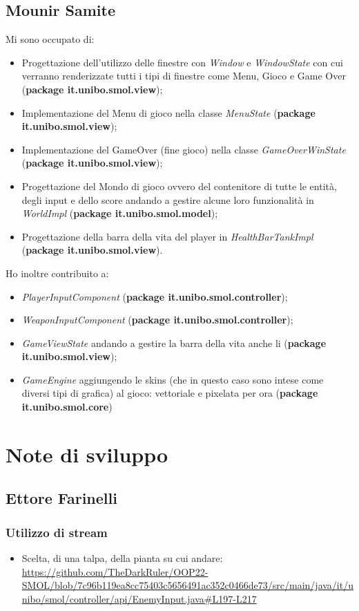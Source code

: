 \documentclass[a4paper,12pt]{report}
\begin{document}
\subsection*{Mounir Samite}
Mi sono occupato di:
\begin{itemize}
    \item Progettazione dell'utilizzo delle finestre con \emph{Window} e \emph{WindowState} con cui verranno renderizzate tutti i tipi di finestre come Menu, Gioco e Game Over (\textbf{package it.unibo.smol.view});
    \item Implementazione del Menu di gioco nella classe \emph{MenuState} (\textbf{package it.unibo.smol.view});
    \item Implementazione del GameOver (fine gioco) nella classe \emph{GameOverWinState} (\textbf{package it.unibo.smol.view});
    \item Progettazione del Mondo di gioco ovvero del contenitore di tutte le entità, degli input e dello score andando a gestire alcune loro funzionalità in \emph{WorldImpl} (\textbf{package it.unibo.smol.model});
    \item Progettazione della barra della vita del player in \emph{HealthBarTankImpl} (\textbf{package it.unibo.smol.view}).
\end{itemize}
Ho inoltre contribuito a:
\begin{itemize}
    \item \emph{PlayerInputComponent} (\textbf{package it.unibo.smol.controller});
    \item \emph{WeaponInputComponent} (\textbf{package it.unibo.smol.controller});
    \item \emph{GameViewState} andando a gestire la barra della vita anche li (\textbf{package it.unibo.smol.view});
    \item \emph{GameEngine} aggiungendo le skins (che in questo caso sono intese come diversi tipi di grafica) al gioco: vettoriale e pixelata per ora (\textbf{package it.unibo.smol.core}) 
\end{itemize}

\section{Note di sviluppo}

\subsection*{Ettore Farinelli}
\subsubsection{Utilizzo di stream}
\begin{itemize}
    \item Scelta, di una talpa, della pianta su cui andare: 
        \url{https://github.com/TheDarkRuler/OOP22-SMOL/blob/7c96b119ea8cc75403c5656491ac352c0466de73/src/main/java/it/unibo/smol/controller/api/EnemyInput.java#L197-L217}
\end{itemize}
\end{document}
